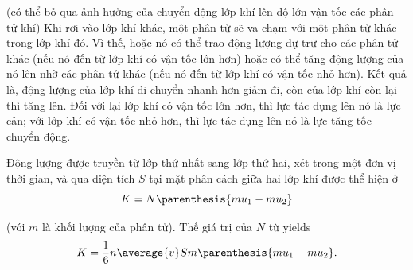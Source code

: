 \noindent
(có thể bỏ qua ảnh hưởng của chuyển động lớp khí lên độ lớn vận tốc các phân tử khí)
Khi rơi vào lớp khí khác, một phân tử sẽ va chạm với một phân tử khác trong lớp khí đó. Vì thế, hoặc nó có thể trao động lượng dự trữ cho các phân tử khác (nếu nó đến từ lớp khí có vận tốc lớn hơn) hoặc có thể tăng động lượng của nó lên nhờ các phân tử khác (nếu nó đến từ lớp khí có vận tốc nhỏ hơn). Kết quả là, động lượng của lớp khí di chuyển nhanh hơn giảm đi, còn của lớp khí còn lại thì tăng lên. Đối với lại lớp khí có vận tốc lớn hơn, thì lực tác dụng lên nó là lực cản; với lớp khí có vận tốc nhỏ hơn, thì lực tác dụng lên nó là lực tăng tốc chuyển động.

Động lượng được truyền từ lớp thứ nhất sang lớp thứ hai, xét trong một đơn vị thời gian, và qua diện tích $S$ tại mặt phân cách giữa hai lớp khí được thể hiện ở 
\begin{equation*}
    K = N \parenthesis{mu_1 - mu_2}
\end{equation*}

\noindent
(với $m$ là khối lượng của phân tử). Thế giá trị của $N$ từ 
yields
\begin{equation}\label{eq:16_29}
    K = \frac{1}{6} n \average{v} S m \parenthesis{mu_1 - mu_2}.
\end{equation}

